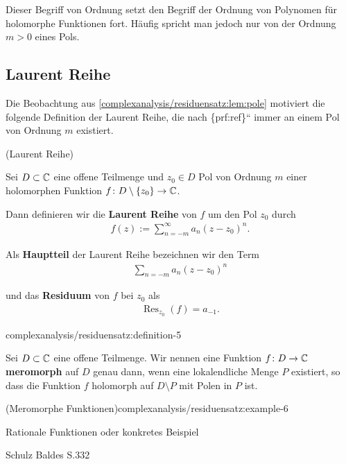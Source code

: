 \par
Dieser Begriff von Ordnung setzt den Begriff der Ordnung von Polynomen für holomorphe Funktionen fort.
Häufig spricht man jedoch nur von der Ordnung \(m > 0\) eines Pols.


\subsection{Laurent Reihe}
\label{\detokenize{complexanalysis/residuensatz:laurent-reihe}}
\par
Die Beobachtung aus \cref{complexanalysis/residuensatz:lem:pole} motiviert die folgende Definition der Laurent Reihe, die nach \{prf:ref\}`` immer an einem Pol von Ordnung \(m\) existiert.
\label{complexanalysis/residuensatz:definition-4}
\begin{emphBox}{}{}{ (Laurent Reihe)}



\par
Sei \(D \subset \mathbb{C}\) eine offene Teilmenge und \(z_0 \in D\) Pol von Ordnung \(m\) einer holomorphen Funktion \(f \colon D \setminus \{z_0\} \rightarrow \mathbb{C}\).

\par
Dann definieren wir die \textbf{Laurent Reihe} von \(f\) um den Pol \(z_0\) durch
\begin{align*}
f(z) := \sum_{n=-m}^\infty a_n (z-z_0)^n.
\end{align*}
\par
Als \textbf{Hauptteil} der Laurent Reihe bezeichnen wir den Term
\begin{align*}
\sum_{n=-m} a_n (z-z_0)^n
\end{align*}
\par
und das \textbf{Residuum} von \(f\) bei \(z_0\) als
\begin{align*}
\operatorname{Res}_{z_0}(f) = a_{-1}.
\end{align*}\begin{definition}{}{complexanalysis/residuensatz:definition-5}



\par
Sei \(D \subset \mathbb{C}\) eine offene Teilmenge.
Wir nennen eine Funktion \(f \colon D \rightarrow \mathbb{C}\) \textbf{meromorph} auf \(D\) genau dann, wenn eine lokalendliche Menge \(P\) existiert, so dass die Funktion \(f\) holomorph auf \(D \setminus P\) mit Polen in \(P\) ist.
\end{definition}
\end{emphBox}
\begin{example}{(Meromorphe Funktionen)}{complexanalysis/residuensatz:example-6}



\par
Rationale Funktionen oder konkretes Beispiel

\par
Schulz Baldes S.332
\end{example}


